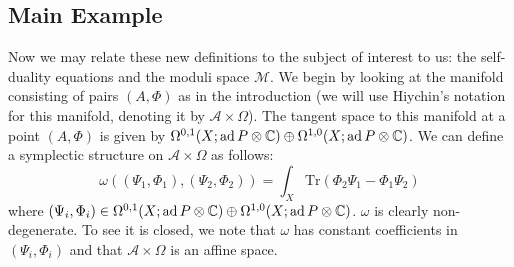 \subsection{Main Example}
Now we may relate these new definitions to the subject of interest to us: the self-duality equations and the moduli space $\mathcal{M}$. We begin by looking at the manifold consisting of pairs $(A,\Phi)$ as in the introduction (we will use Hiychin's notation for this manifold, denoting it by $\mathscr{A}\times \Omega$). The tangent space to this manifold at a point $(A,\Phi)$ is given by $\Omega^{0,1}(X;\mathrm{ad}\, P\otimes \mathbb{C})\oplus \Omega^{1,0}(X;\mathrm{ad}\, P\otimes \mathbb{C})$. We can define a symplectic structure on $\mathscr{A}\times \Omega$ as follows:
\begin{equation*}
  \omega((\Psi_1,\Phi_1),(\Psi_2 ,\Phi_2)) = \int_X \mathrm{Tr}(\Phi_2\Psi_1 - \Phi_1\Psi_2)
\end{equation*}
where $(\Psi_i,\Phi_i)\in \Omega^{0,1}(X;\mathrm{ad}\, P\otimes \mathbb{C})\oplus \Omega^{1,0}(X;\mathrm{ad}\, P\otimes \mathbb{C})$. $\omega$ is clearly non-degenerate. To see it is closed, we note that $\omega$ has constant coefficients in $(\Psi_i,\Phi_i)$ and that $\mathscr{A}\times \Omega$ is an affine space. 

